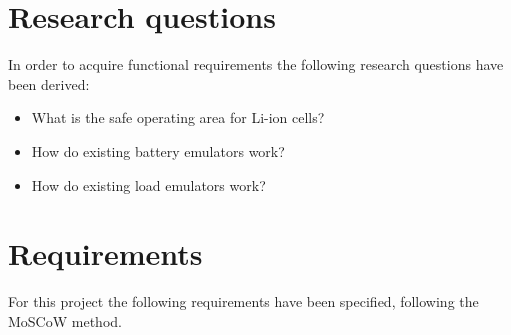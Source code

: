 \section{Research questions}
In order to acquire functional requirements the following research questions have been derived:
\begin{itemize}
    \item What is the safe operating area for Li-ion cells?
    \item How do existing battery emulators work?
    \item How do existing load emulators work?
\end{itemize}

\section{Requirements}
For this project the following requirements have been specified, following the MoSCoW method. 

